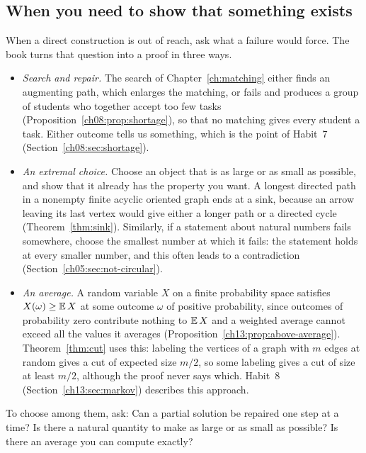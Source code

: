 \subsection*{When you need to show that something exists}
When a direct construction is out of reach, ask what a failure would force. The book turns that question into a proof in three ways.
\begin{itemize}
\item \emph{Search and repair.} The search of Chapter~\ref{ch:matching} either finds an augmenting path, which enlarges the matching, or fails and produces a group of students who together accept too few tasks (Proposition~\ref{ch08:prop:shortage}), so that no matching gives every student a task. Either outcome tells us something, which is the point of Habit~7 (Section~\ref{ch08:sec:shortage}).
\item \emph{An extremal choice.} Choose an object that is as large or as small as possible, and show that it already has the property you want. A longest directed path in a nonempty finite acyclic oriented graph ends at a sink, because an arrow leaving its last vertex would give either a longer path or a directed cycle (Theorem~\ref{thm:sink}). Similarly, if a statement about natural numbers fails somewhere, choose the smallest number at which it fails: the statement holds at every smaller number, and this often leads to a contradiction (Section~\ref{ch05:sec:not-circular}).
\item \emph{An average.} A random variable $X$ on a finite probability space satisfies $X(\omega)\ge\operatorname{\mathbb E} X$ at some outcome $\omega$ of positive probability, since outcomes of probability zero contribute nothing to $\operatorname{\mathbb E} X$ and a weighted average cannot exceed all the values it averages (Proposition~\ref{ch13:prop:above-average}). Theorem~\ref{thm:cut} uses this: labeling the vertices of a graph with $m$ edges at random gives a cut of expected size $m/2$, so some labeling gives a cut of size at least $m/2$, although the proof never says which. Habit~8 (Section~\ref{ch13:sec:markov}) describes this approach.
\end{itemize}
To choose among them, ask: Can a partial solution be repaired one step at a time? Is there a natural quantity to make as large or as small as possible? Is there an average you can compute exactly?

